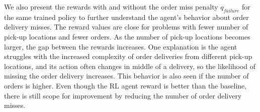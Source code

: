 \documentclass[letterpaper]{article} %
\begin{document}
We also present the rewards with and without the order miss penalty $q_{failure}$ for the same trained policy to further understand the agent's behavior about order delivery misses. The reward values are close for problems with fewer number of pick-up locations and fewer orders. As the number of pick-up locations becomes larger, the gap between the rewards increases. One explanation is the agent struggles with the increased complexity of order deliveries from different pick-up locations, and its action often changes in middle of a delivery, so the likelihood of missing the order delivery increases. This behavior is also seen if the number of orders is higher. Even though the RL agent reward is better than the baseline, there is still scope for improvement by reducing the number of order delivery misses.

\begin{table}[h!]
\end{table}
\end{document}
